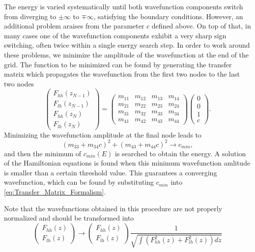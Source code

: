 The energy is varied systematically until both wavefunction components
switch from diverging to $\pm\infty$ to $\mp\infty$, satisfying
the boundary conditions. However, an additional problem araises from
the parameter $c$ defined above. On top of that, in many cases one
of the wavefunction components exhibit a very sharp sign switching,
often twice within a single energy search step. In order to work around
these problems, we minimize the amplitude of the wavefunction at the
end of the grid. The function to be minimized can be found by generating
the transfer matrix which propagates the wavefunction from the first
two nodes to the last two nodes\begin{equation}
\left(\begin{array}{c}
F_{hh}(z_{N-1})\\
F_{lh}(z_{N-1})\\
F_{hh}(z_{N})\\
F_{lh}(z_{N})\end{array}\right)=\left(\begin{array}{cccc}
m_{11} & m_{12} & m_{13} & m_{14}\\
m_{21} & m_{22} & m_{23} & m_{24}\\
m_{31} & m_{32} & m_{33} & m_{34}\\
m_{41} & m_{42} & m_{43} & m_{44}\end{array}\right)\left(\begin{array}{c}
0\\
0\\
1\\
c\end{array}\right).\end{equation}
Minimizing the wavefunction amplitude at the final node leads to\begin{equation}
\left(m_{33}+m_{34}c\right)^{2}+\left(m_{43}+m_{44}c\right)^{2}\rightarrow c_{min},\end{equation}
and then the minimum of $c_{min}(E)$ is searched to obtain the energy.
A solution of the Hamiltonian equations is found when this minimum
wavefunction amlitude is smaller than a certain threshold value. This
guarantees a converging wavefunction, which can be found by substituting
$c_{min}$ into \ref{eq:Transfer_Matrix_Formalism}. 

Note that the wavefunctions obtained in this procedure are not properly
normalized and should be transformed into \begin{equation}
\left(\begin{array}{c}
F_{hh}(z)\\
F_{lh}(z)\end{array}\right)\rightarrow\left(\begin{array}{c}
F_{hh}(z)\\
F_{lh}(z)\end{array}\right)\frac{1}{\sqrt{\int\left(F_{hh}^{2}(z)+F_{lh}^{2}(z)\right)dz}}\end{equation}

